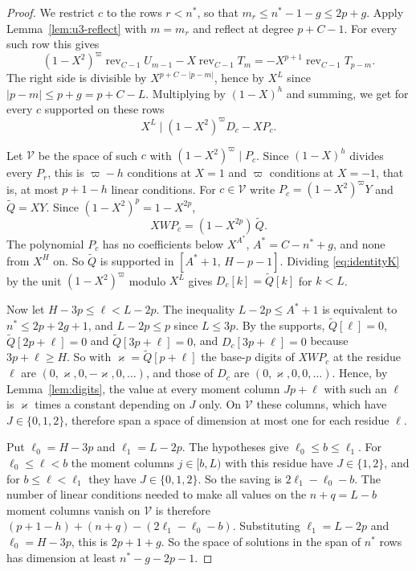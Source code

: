 \documentclass[11pt]{amsart}
\theoremstyle{definition}
\theoremstyle{remark}
\numberwithin{equation}{section}
\newcommand{\cV}{\mathcal V}
\begin{document}
\begin{proof}
We restrict $c$ to the rows $r<n^*$, so that $m_r\le n^*-1-g\le2p+g$. Apply Lemma~\ref{lem:u3-reflect} with
$m=m_r$ and reflect at degree $p+C-1$. For every such row this gives
\[
 (1-X^2)^\varpi\operatorname{rev}_{C-1}U_{m-1}-X\operatorname{rev}_{C-1}T_m=-X^{p+1}\operatorname{rev}_{C-1}T_{p-m}.
\]
The right side is divisible by $X^{p+C-|p-m|}$, hence by $X^L$ since $|p-m|\le p+g=p+C-L$. Multiplying by
$(1-X)^h$ and summing, we get for every $c$ supported on these rows
\begin{equation}\label{eq:identityK}
 X^L\mid(1-X^2)^\varpi D_c-XP_c .
\end{equation}

Let $\cV$ be the space of such $c$ with $(1-X^2)^\varpi\mid P_c$. Since $(1-X)^h$ divides every $P_r$, this is
$\varpi-h$ conditions at $X=1$ and $\varpi$ conditions at $X=-1$, that is, at most $p+1-h$ linear
conditions. For $c\in\cV$ write $P_c=(1-X^2)^\varpi Y$ and $\widetilde Q=XY$. Since $(1-X^2)^p=1-X^{2p}$,
\[
 XWP_c=(1-X^{2p})\,\widetilde Q .
\]
The polynomial $P_c$ has no coefficients below $X^{A^*}$, $A^*=C-n^*+g$, and none from $X^H$ on. So
$\widetilde Q$ is supported in $[A^*+1,\,H-p-1]$. Dividing \eqref{eq:identityK} by the unit $(1-X^2)^\varpi$
modulo $X^L$ gives $D_c[k]=\widetilde Q[k]$ for $k<L$.

Now let $H-3p\le\ell<L-2p$. The inequality $L-2p\le A^*+1$ is equivalent to $n^*\le2p+2g+1$, and
$L-2p\le p$ since $L\le3p$. By the supports, $\widetilde Q[\ell]=0$, $\widetilde Q[2p+\ell]=0$ and
$\widetilde Q[3p+\ell]=0$, and $D_c[3p+\ell]=0$ because $3p+\ell\ge H$. So with
$\varkappa=\widetilde Q[p+\ell]$ the base-$p$ digits of $XWP_c$ at the residue $\ell$ are
$(0,\varkappa,0,-\varkappa,0,\dots)$, and those of $D_c$ are $(0,\varkappa,0,0,\dots)$. Hence, by
Lemma~\ref{lem:digits}, the value at every moment column $Jp+\ell$ with such an $\ell$ is $\varkappa$ times a
constant depending on $J$ only. On $\cV$ these columns, which have $J\in\{0,1,2\}$, therefore span a space
of dimension at most one for each residue $\ell$.

Put $\ell_0=H-3p$ and $\ell_1=L-2p$. The hypotheses give $\ell_0\le b\le\ell_1$. For $\ell_0\le\ell<b$ the
moment columns $j\in[b,L)$ with this residue have $J\in\{1,2\}$, and for $b\le\ell<\ell_1$ they have
$J\in\{0,1,2\}$. So the saving is $2\ell_1-\ell_0-b$. The number of linear conditions needed to make all
values on the $n+q=L-b$ moment columns vanish on $\cV$ is therefore
$(p+1-h)+(n+q)-(2\ell_1-\ell_0-b)$. Substituting $\ell_1=L-2p$ and $\ell_0=H-3p$, this is $2p+1+g$. So the
space of solutions in the span of $n^*$ rows has dimension at least $n^*-g-2p-1$.
\end{proof}
\end{document}
